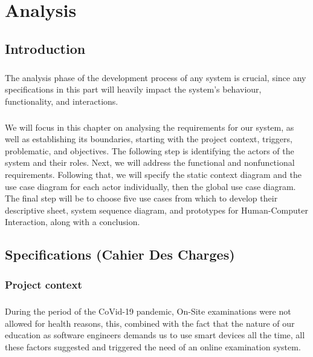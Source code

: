 \documentclass[]{uc2pfecaneva}
\title{}
\author{}
\begin{document}
    \setlength{\parskip}{6pts}

    \tableofcontents
    \listoffigures
    \listoftables
    \chapter{Analysis}

    \newpage

    \raggedright\section{Introduction}
    \paragraph{}
    The analysis phase of the development process of any system is crucial, since any specifications in this part will heavily impact the system's behaviour, functionality, and interactions.
    \paragraph{}
    We will focus in this chapter on analysing the requirements for our system, as well as establishing its boundaries, starting with the project context, triggers, problematic, and objectives. The following step is identifying the actors of the system and their roles. Next, we will address the functional and nonfunctional requirements. Following that, we will specify the static context diagram and the use case diagram for each actor individually, then the global use case diagram. The final step will be to choose five use cases from which to develop their descriptive sheet, system sequence diagram, and prototypes for Human-Computer Interaction, along with a conclusion.

    \raggedright\section{Specifications (Cahier Des Charges)}
    \subsection{Project context}
    \paragraph{}
    During the period of the CoVid-19 pandemic, On-Site examinations were not allowed for health reasons, this, combined with the fact that the nature of our education as software engineers demands us to use smart devices all the time, all these factors suggested and triggered the need of an online examination system.
\end{document}
